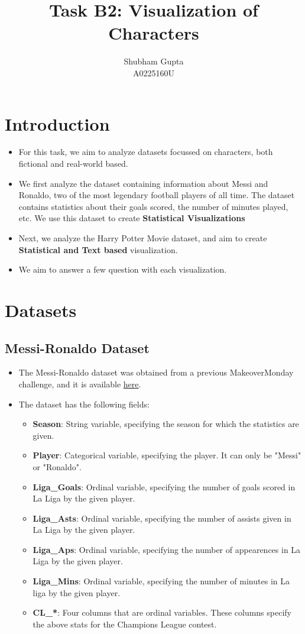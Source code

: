 \documentclass[a4paper]{article}
\title{Task B2: Visualization of Characters}
\author{Shubham Gupta \\ A0225160U}
\begin{document}
\maketitle

\section{Introduction}
\begin{itemize}
    \item For this task, we aim to analyze datasets focussed on characters, both fictional and real-world based.
    \item We first analyze the dataset containing information about Messi and Ronaldo, two of the most legendary football players of all time. The dataset contains statistics about their goals scored, the number of minutes played, etc. We use this dataset to create \textbf{Statistical Visualizations}  
    \item Next, we analyze the Harry Potter Movie dataset, and aim to create \textbf{Statistical and Text based} visualization. 
    \item We aim to answer a few question with each visualization.
\end{itemize}

\section{Datasets}
\subsection{Messi-Ronaldo Dataset}
\begin{itemize}
    \item  The Messi-Ronaldo dataset was obtained from a previous MakeoverMonday challenge, and it is available \href{https://data.world/makeovermonday/2020w15-messi-vs-ronaldo-stats}{here}.
    \item The dataset has the following fields:
    \begin{itemize}
        \item \textbf{Season}: String variable, specifying the season for which the statistics are given.
        \item \textbf{Player}: Categorical variable, specifying the player. It can only be "Messi" or "Ronaldo".
        \item \textbf{Liga\_Goals}:  Ordinal variable, specifying the number of goals scored in La Liga by the given player. 
        \item \textbf{Liga\_Asts}:  Ordinal variable, specifying the number of assists given in La Liga by the given player. 
        \item \textbf{Liga\_Aps}:  Ordinal variable, specifying the number of appearences in La Liga by the given player. 
        \item \textbf{Liga\_Mins}: Ordinal variable, specifying the number of minutes in La liga by the given player.  
        \item \textbf{CL\_*}: Four columns that are ordinal variables. These columns specify the above stats for the Champions League contest.  
    \end{itemize}
\end{itemize}
\end{document}
